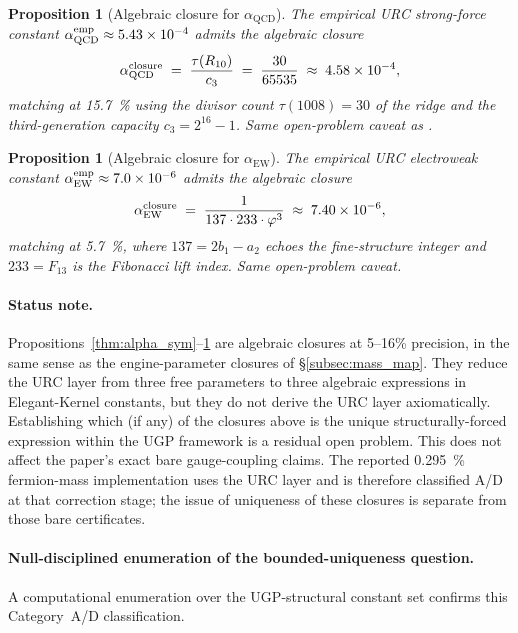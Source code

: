 \documentclass[11pt]{article}
\newtheorem{proposition}[theorem]{Proposition}
\theoremstyle{remark}
\begin{document}
\begin{proposition}[Algebraic closure for $\alpha_{\mathrm{QCD}}$]
\label{thm:alpha_qcd}
The empirical URC strong-force constant $\alpha_{\mathrm{QCD}}^{\rm emp} \approx 5.43 \times 10^{-4}$ admits the algebraic closure
\begin{equation}
\alpha_{\mathrm{QCD}}^{\rm closure} \;=\; \frac{\tau(R_{10})}{c_3} \;=\; \frac{30}{65535} \;\approx\; 4.58 \times 10^{-4},
\end{equation}
matching at \SI{15.7}{\percent} using the divisor count $\tau(1008) = 30$ of the ridge and the third-generation capacity $c_3 = 2^{16} - 1$.  Same open-problem caveat as .
\end{proposition}

\begin{proposition}[Algebraic closure for $\alpha_{\mathrm{EW}}$]
\label{thm:alpha_ew}
The empirical URC electroweak constant $\alpha_{\mathrm{EW}}^{\rm emp} \approx 7.0 \times 10^{-6}$ admits the algebraic closure
\begin{equation}
\alpha_{\mathrm{EW}}^{\rm closure} \;=\; \frac{1}{137 \cdot 233 \cdot \varphi^3} \;\approx\; 7.40 \times 10^{-6},
\end{equation}
matching at \SI{5.7}{\percent}, where $137 = 2b_1 - a_2$ echoes the fine-structure integer and $233 = F_{13}$ is the Fibonacci lift index.  Same open-problem caveat.
\end{proposition}

\paragraph{Status note.}
Propositions~\ref{thm:alpha_sym}--\ref{thm:alpha_ew} are algebraic closures at 5--16\% precision, in the same sense as the engine-parameter closures of \S\ref{subsec:mass_map}.  They reduce the URC layer from three free parameters to three algebraic expressions in Elegant-Kernel constants, but they do not derive the URC layer axiomatically.  Establishing which (if any) of the closures above is the unique structurally-forced expression within the UGP framework is a residual open problem.  This does not affect the paper's exact bare gauge-coupling claims.  The reported \SI{0.295}{\percent} fermion-mass implementation uses the URC layer and is therefore classified A/D at that correction stage; the issue of uniqueness of these closures is separate from those bare certificates.

\paragraph{Null-disciplined enumeration of the bounded-uniqueness question.}
A computational enumeration over the UGP-structural constant set confirms this Category~A/D classification.
\end{document}
